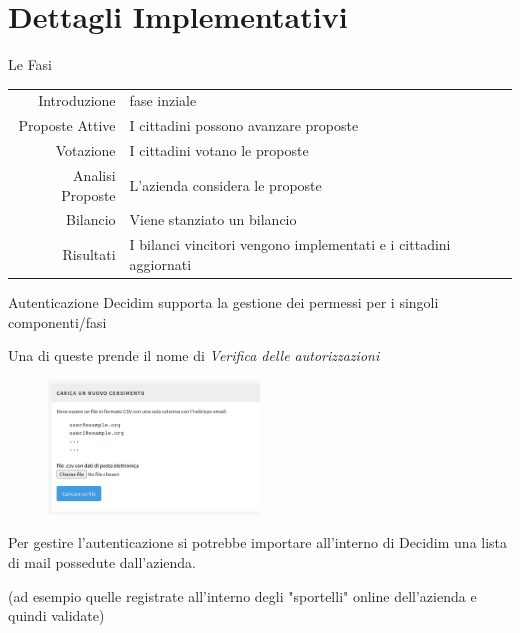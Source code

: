 \section{Dettagli Implementativi}

\begin{frame}{Le Fasi}
  \begin{table}
    \renewcommand\arraystretch{1.4}

    \begin{tabular}{@{\,}r <{\hskip 2pt} !{\foo} >{\raggedright\arraybackslash}p{5cm}}

      \addlinespace[1.5ex]
      Introduzione     & \small{fase inziale}                                                      \\
      Proposte Attive  & \small{I cittadini possono avanzare proposte}                             \\
      Votazione        & \small{I cittadini votano le proposte  }                                  \\
      Analisi Proposte & \small{L'azienda considera le proposte}                                   \\
      Bilancio         & \small{Viene stanziato un bilancio }                                      \\
      Risultati        & \small{I bilanci vincitori vengono implementati e i cittadini aggiornati} \\
    \end{tabular}
  \end{table}
\end{frame}
\begin{frame}{Autenticazione}
  Decidim supporta la gestione dei permessi per i singoli componenti/fasi

  Una di queste prende il nome di \emph{Verifica delle autorizzazioni}

  \begin{figure}
    \centering
    \includegraphics[width=0.50\textwidth]{images/auth}
  \end{figure}

  Per gestire l'autenticazione si potrebbe importare all'interno di Decidim una lista di mail possedute dall'azienda.

  (ad esempio quelle registrate all'interno degli "sportelli" online dell'azienda e quindi validate)

\end{frame}